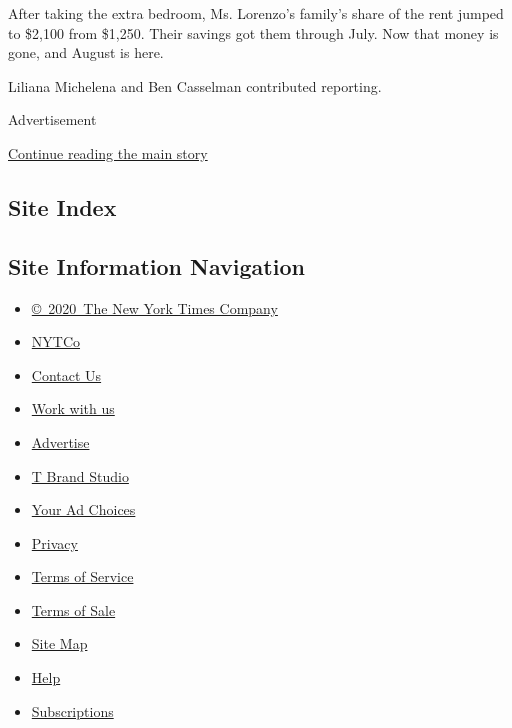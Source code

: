 After taking the extra bedroom, Ms. Lorenzo's family's share of the rent
jumped to \$2,100 from \$1,250. Their savings got them through July. Now
that money is gone, and August is here.

Liliana Michelena and Ben Casselman contributed reporting.

Advertisement

\protect\hyperlink{after-bottom}{Continue reading the main story}

\hypertarget{site-index}{%
\subsection{Site Index}\label{site-index}}

\hypertarget{site-information-navigation}{%
\subsection{Site Information
Navigation}\label{site-information-navigation}}

\begin{itemize}
\tightlist
\item
  \href{https://help.nytimes3xbfgragh.onion/hc/en-us/articles/115014792127-Copyright-notice}{©~2020~The
  New York Times Company}
\end{itemize}

\begin{itemize}
\tightlist
\item
  \href{https://www.nytco.com/}{NYTCo}
\item
  \href{https://help.nytimes3xbfgragh.onion/hc/en-us/articles/115015385887-Contact-Us}{Contact
  Us}
\item
  \href{https://www.nytco.com/careers/}{Work with us}
\item
  \href{https://nytmediakit.com/}{Advertise}
\item
  \href{http://www.tbrandstudio.com/}{T Brand Studio}
\item
  \href{https://www.nytimes3xbfgragh.onion/privacy/cookie-policy\#how-do-i-manage-trackers}{Your
  Ad Choices}
\item
  \href{https://www.nytimes3xbfgragh.onion/privacy}{Privacy}
\item
  \href{https://help.nytimes3xbfgragh.onion/hc/en-us/articles/115014893428-Terms-of-service}{Terms
  of Service}
\item
  \href{https://help.nytimes3xbfgragh.onion/hc/en-us/articles/115014893968-Terms-of-sale}{Terms
  of Sale}
\item
  \href{https://spiderbites.nytimes3xbfgragh.onion}{Site Map}
\item
  \href{https://help.nytimes3xbfgragh.onion/hc/en-us}{Help}
\item
  \href{https://www.nytimes3xbfgragh.onion/subscription?campaignId=37WXW}{Subscriptions}
\end{itemize}
